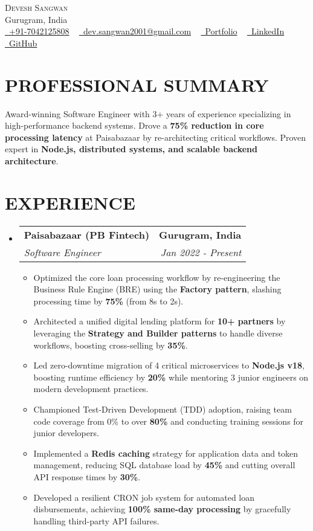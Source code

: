 \documentclass{fonts}
\makeatletter
\newcommand{\resumeSubheading}[4]{
  \vspace{-2pt}\item
    \begin{tabular*}{1.0\textwidth}[t]{l@{\extracolsep{\fill}}r}
      \textbf{\large#1} & \textbf{\small #2} \\
      \textit{\large#3} & \textit{\small #4} \\
    \end{tabular*}\vspace{-7pt}
}
\newcommand{\resumeItem}[1]{
  \item\small{
    {#1 \vspace{-2pt}}
  }
}
\newcommand{\resumeSubHeadingListStart}{\begin{itemize}[leftmargin=0.0in, label={}]}
\newcommand{\resumeSubHeadingListEnd}{\end{itemize}}
\newcommand{\resumeItemListStart}{\begin{itemize}}
\newcommand{\resumeItemListEnd}{\end{itemize}\vspace{-5pt}}
\makeatother
\begin{document}
\begin{center}
    {\Huge \scshape Devesh Sangwan} \\ \vspace{1pt}
    Gurugram, India \\
    \small \href{tel:+91-7042125808}{\raisebox{-0.1\height}\faPhone~+91-7042125808} ~
    \href{mailto:dev.sangwan2001@gmail.com}{\raisebox{-0.2\height}\faEnvelope~dev.sangwan2001@gmail.com} ~
    \href{https://deveshsangwan.com}{\raisebox{-0.1\height}{\faGlobe}~Portfolio} ~
    \href{https://www.linkedin.com/in/deveshsangwan/}{\raisebox{-0.2\height}\faLinkedin~LinkedIn} ~
    \href{https://github.com/deveshsangwan}{\raisebox{-0.2\height}\faGithub~GitHub}
\end{center}

\section{PROFESSIONAL SUMMARY}
\vspace{-2pt}
\small{Award-winning Software Engineer with 3+ years of experience specializing in high-performance backend systems. Drove a \textbf{75\% reduction in core processing latency} at Paisabazaar by re-architecting critical workflows. Proven expert in \textbf{Node.js, distributed systems, and scalable backend architecture}.}

\section{EXPERIENCE}
  \resumeSubHeadingListStart
    \resumeSubheading
      {Paisabazaar (PB Fintech)}{Gurugram, India}
      {Software Engineer}{Jan 2022 - Present}
      \resumeItemListStart
        \resumeItem{Optimized the core loan processing workflow by re-engineering the Business Rule Engine (BRE) using the \textbf{Factory pattern}, slashing processing time by \textbf{75\%} (from 8s to 2s).}
        \resumeItem{Architected a unified digital lending platform for \textbf{10+ partners} by leveraging the \textbf{Strategy and Builder patterns} to handle diverse workflows, boosting cross-selling by \textbf{35\%}.}
        \resumeItem{Led zero-downtime migration of 4 critical microservices to \textbf{Node.js v18}, boosting runtime efficiency by \textbf{20\%} while mentoring 3 junior engineers on modern development practices.}
        \resumeItem{Championed Test-Driven Development (TDD) adoption, raising team code coverage from 0\% to over \textbf{80\%} and conducting training sessions for junior developers.}
        \resumeItem{Implemented a \textbf{Redis caching} strategy for application data and token management, reducing SQL database load by \textbf{45\%} and cutting overall API response times by \textbf{30\%}.}
        \resumeItem{Developed a resilient CRON job system for automated loan disbursements, achieving \textbf{100\% same-day processing} by gracefully handling third-party API failures.}
      \resumeItemListEnd
  \resumeSubHeadingListEnd
\end{document}
